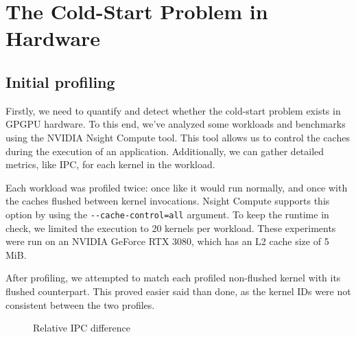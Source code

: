 \chapter{The Cold-Start Problem in Hardware}\label{ch:hw-analysis}

\section{Initial profiling}\label{sec:initial-profiling}
Firstly, we need to quantify and detect whether the cold-start problem exists in GPGPU hardware.
To this end, we've analyzed some workloads and benchmarks using the NVIDIA Nsight Compute tool.
This tool allows us to control the caches during the execution of an application.
Additionally, we can gather detailed metrics, like IPC, for each kernel in the workload.

Each workload was profiled twice: once like it would run normally, and once with the caches flushed between kernel invocations.
Nsight Compute supports this option by using the \verb|--cache-control=all| argument.
To keep the runtime in check, we limited the execution to 20 kernels per workload.
These experiments were run on an NVIDIA GeForce RTX 3080\cite{nvidia-wp}, which has an L2 cache size of 5 MiB\@.

After profiling, we attempted to match each profiled non-flushed kernel with its flushed counterpart.
This proved easier said than done, as the kernel IDs were not consistent between the two profiles.

\begin{figure}
    \centering
    \resizebox{0.45\textwidth}{!}{}
    \resizebox{0.45\textwidth}{!}{}
    \caption{Relative IPC difference}
    \label{fig:ipc_diff}
\end{figure}

